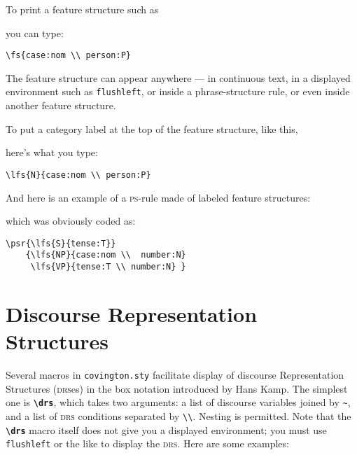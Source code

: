 \documentclass[english]{article}
\newcommand*\jmacro[1]{\textbf{\texttt{#1}}}
\newcommand*\jcsmacro[1]{\jmacro{\textbackslash{#1}}}
\newcommand*\jfenv[1]{\texttt{#1}}
\begin{document}
To print a feature structure such as
\begin{flushleft}
\end{flushleft}
you can type:
\begin{lstlisting}[moretexcs={fs}]
\fs{case:nom \\ person:P}
\end{lstlisting}

The feature structure can appear anywhere --- in continuous text, in a
displayed environment such as \jfenv{flushleft}, or inside a
phrase-structure rule, or even inside another feature structure.

To put a category label at the top of the feature structure, like this,
\begin{flushleft}
\end{flushleft}
here's what you type:
\begin{lstlisting}[moretexcs={lfs}]
\lfs{N}{case:nom \\ person:P}
\end{lstlisting}
And here is an example of a \textsc{ps}-rule made of labeled feature structures:
\begin{flushleft}
    {
      }
\end{flushleft}
which was obviously coded as:
\begin{lstlisting}[moretexcs={lfs,psr}]
\psr{\lfs{S}{tense:T}}
    {\lfs{NP}{case:nom \\  number:N}
     \lfs{VP}{tense:T \\ number:N} }
\end{lstlisting}


\section{Discourse Representation Structures}

Several macros in \texttt{covington.sty} facilitate display of discourse 
Representation Structures (\textsc{drs}es) in the box notation introduced by 
Hans Kamp.  The simplest one is \jcsmacro{drs}, which takes two arguments:
a list of discourse variables joined by \verb"~", and a list of \textsc{drs} 
conditions separated by \verb"\\".  Nesting is permitted.  Note that the 
\jcsmacro{drs} macro itself does not give you a displayed environment; you 
must use \jfenv{flushleft} or the like to display the \textsc{drs}.
Here are some examples:
\end{document}
